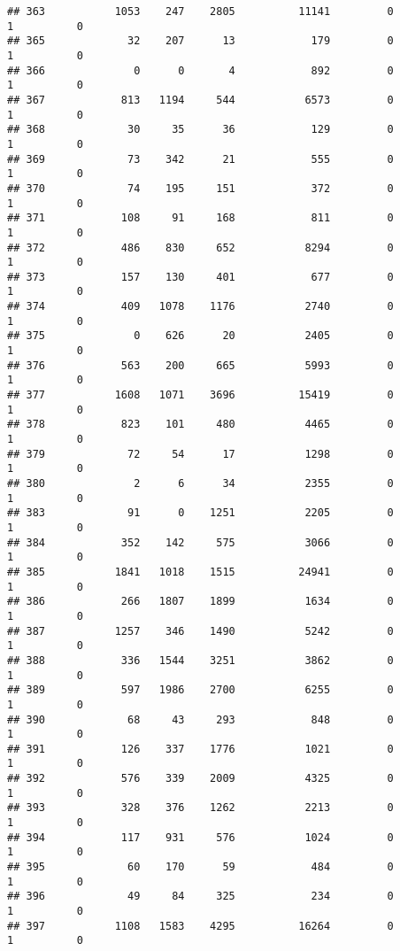 \documentclass[
]{article}
\begin{document}
\begin{verbatim}
## 363           1053    247    2805          11141         0         1          0
## 365             32    207      13            179         0         1          0
## 366              0      0       4            892         0         1          0
## 367            813   1194     544           6573         0         1          0
## 368             30     35      36            129         0         1          0
## 369             73    342      21            555         0         1          0
## 370             74    195     151            372         0         1          0
## 371            108     91     168            811         0         1          0
## 372            486    830     652           8294         0         1          0
## 373            157    130     401            677         0         1          0
## 374            409   1078    1176           2740         0         1          0
## 375              0    626      20           2405         0         1          0
## 376            563    200     665           5993         0         1          0
## 377           1608   1071    3696          15419         0         1          0
## 378            823    101     480           4465         0         1          0
## 379             72     54      17           1298         0         1          0
## 380              2      6      34           2355         0         1          0
## 383             91      0    1251           2205         0         1          0
## 384            352    142     575           3066         0         1          0
## 385           1841   1018    1515          24941         0         1          0
## 386            266   1807    1899           1634         0         1          0
## 387           1257    346    1490           5242         0         1          0
## 388            336   1544    3251           3862         0         1          0
## 389            597   1986    2700           6255         0         1          0
## 390             68     43     293            848         0         1          0
## 391            126    337    1776           1021         0         1          0
## 392            576    339    2009           4325         0         1          0
## 393            328    376    1262           2213         0         1          0
## 394            117    931     576           1024         0         1          0
## 395             60    170      59            484         0         1          0
## 396             49     84     325            234         0         1          0
## 397           1108   1583    4295          16264         0         1          0

\end{verbatim}
\end{document}
